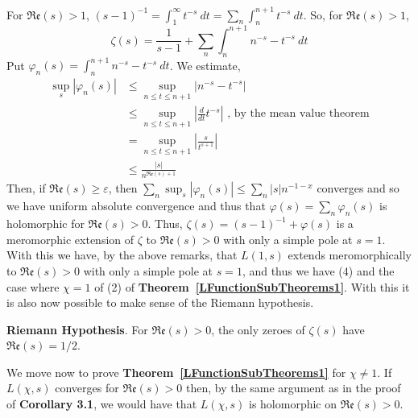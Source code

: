 \documentclass[12pt]{article}
\newcommand{\tref}[1]{\textbf{Theorem~\ref{#1}}}
\numberwithin{equation}{section}
\numberwithin{thm}{section}
\numberwithin{lemma}{section}
\numberwithin{cor}{section}
\begin{document}
For $\mathfrak{Re}(s) > 1$, $(s-1)^{-1} = \int_1^{\infty} t^{-s} \ dt = \sum_{n} \int_n^{n+1} t^{-s} \ dt$. So, for $\mathfrak{Re}(s) > 1$, \begin{equation*}
  \zeta(s) = \frac{1}{s-1} + \sum_n \int_n^{n+1} n^{-s} - t^{-s} \ dt
\end{equation*} Put $\varphi_n(s) = \int_n^{n+1} n^{-s} - t^{-s} \ dt$. We estimate, \begin{align*}
  \sup_s |\varphi_n(s)| &\leq \sup_{n \leq t \leq n+1} |n^{-s} - t^{-s}| \\
  &\leq \sup_{n \leq t \leq n+1} \left| \frac{d}{dt} t^{-s} \right| \text{ , by the mean value theorem} \\
  &= \sup_{n \leq t \leq n+1} \left| \frac{s}{t^{s+1}} \right| \\
  &\leq \frac{|s|}{n^{\mathfrak{Re}(s) + 1}}
\end{align*} Then, if $\mathfrak{Re}(s) \geq \varepsilon$, then $\sum_n \sup_s |\varphi_n(s)| \leq \sum_n |s| n^{-1-x}$ converges and so we have uniform absolute convergence and thus that $\varphi(s) = \sum_n \varphi_n(s)$ is holomorphic for $\mathfrak{Re}(s) > 0$. Thus, $\zeta(s) = (s-1)^{-1} + \varphi(s)$ is a meromorphic extension of $\zeta$ to $\mathfrak{Re}(s) > 0$ with only a simple pole at $s = 1$. With this we have, by the above remarks, that $L(1, s)$ extends meromorphically to $\mathfrak{Re}(s) > 0$ with only a simple pole at $s = 1$, and thus we have (4) and the case where $\chi = 1$ of (2) of \tref{LFunctionSubTheorems1}. With this it is also now possible to make sense of the Riemann hypothesis.

\textbf{Riemann Hypothesis}. For $\mathfrak{Re}(s) > 0$, the only zeroes of $\zeta(s)$ have $\mathfrak{Re}(s) = 1/2$.

We move now to prove \tref{LFunctionSubTheorems1} for $\chi \ne 1$. If $L(\chi, s)$ converges for $\mathfrak{Re}(s)>0$ then, by the same argument as in the proof of \textbf{Corollary 3.1}, we would have that $L(\chi, s)$ is holomorphic on $\mathfrak{Re}(s) > 0$.
\end{document}
